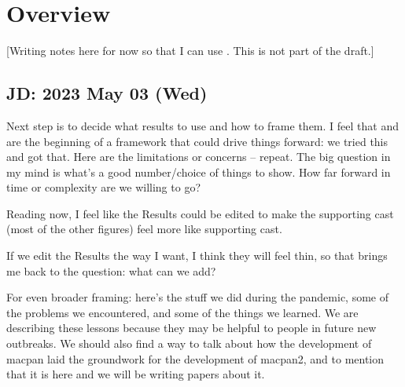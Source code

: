 \documentclass[12pt]{article}\usepackage[]{graphicx}\usepackage[]{color}
\begin{document}

\tableofcontents




\section*{Overview}

[Writing notes here for now so that I can use . This is not part of the draft.]

\subsection*{JD: 2023 May 03 (Wed)}

Next step is to decide what results to use and how to frame them. I feel that  and  are the beginning of a framework that could drive things forward: we tried this and got that. Here are the limitations or concerns – repeat. The big question in my mind is what's a good number/choice of things to show. How far forward in time or complexity are we willing to go? 

Reading now, I feel like the Results could be edited to make the supporting cast (most of the other figures) feel more like supporting cast. 

If we edit the Results the way I want, I think they will feel thin, so that brings me back to the question: what can we add? 

For even broader framing: here's the stuff we did during the pandemic, some of the problems we encountered, and some of the things we learned. We are describing these lessons because they may be helpful to people in future new outbreaks. We should also find a way to talk about how the development of macpan laid the groundwork for the development of macpan2, and to mention that it is here and we will be writing papers about it. 
\end{document}

